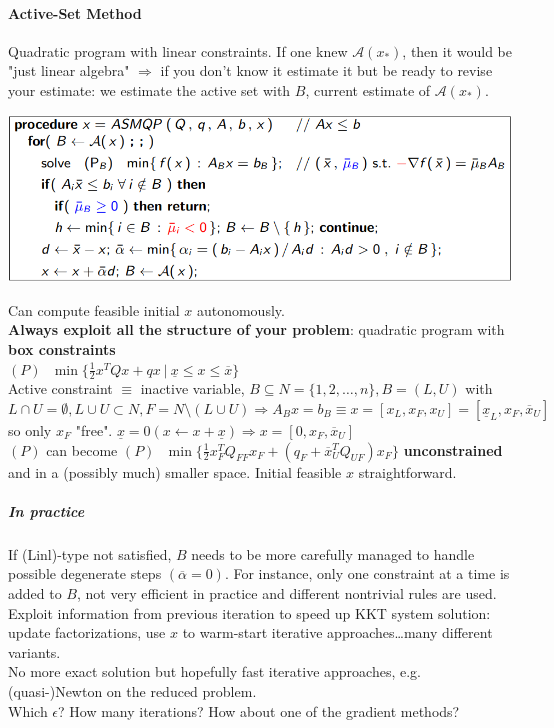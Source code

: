 \documentclass[10pt]{report}
\begin{document}
\paragraph{Active-Set Method} Quadratic program with linear constraints. If one knew $\mathscr{A}(x_*)$, then it would be "just linear algebra" $\Rightarrow$ if you don't know it estimate it but be ready to revise your estimate: we estimate the active set with $B$, current estimate of $\mathscr{A}(x_*)$.
\begin{center}
	\includegraphics[scale=0.75]{10.png}
\end{center}
Can compute feasible initial $x$ autonomously.\\
\textbf{Always exploit all the structure of your problem}: quadratic program with \textbf{box constraints}\\$(P)\:\:\:\min\{\frac{1}{2}x^TQx+qx\:|\:\underline{x}\leq x\leq \overline{x}\}$\\
Active constraint $\equiv$ inactive variable, $B\subseteq N=\{1,2,\ldots,n\}, B = (L,U)$ with $L\cap U=\emptyset, L\cup U \subset N, F = N\setminus (L\cup U)\Rightarrow A_Bx=b_B \equiv x = [x_L, x_F, x_U]=[\underline{x}_L, x_F, \overline{x}_U]$ so only $x_F$ "free". $\underline{x} = 0 (x\leftarrow x+\underline{x})\Rightarrow x=[0, x_F, \overline{x}_U]$\\
$(P)$ can become $(P)\:\:\:\min\{\frac{1}{2}x_F^TQ_{FF}x_F+(q_F+\overline{x}_U^TQ_{UF})x_F\}$ \textbf{unconstrained} and in a (possibly much) smaller space. Initial feasible $x$ straightforward.
\subparagraph{In practice} If (Linl)-type not satisfied, $B$ needs to be more carefully managed to handle possible degenerate steps $(\overline{\alpha}=0)$. For instance, only one constraint at a time is added to $B$, not very efficient in practice and different nontrivial rules are used.\\
Exploit information from previous iteration to speed up KKT system solution: update factorizations, use $x$ to warm-start iterative approaches\ldots many different variants.\\
No more exact solution but hopefully fast iterative approaches, e.g. (quasi-)Newton on the reduced problem.\\
Which $\epsilon$? How many iterations? How about one of the gradient methods?
\end{document}
